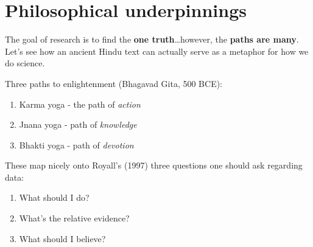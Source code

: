 \documentclass[11pt]{article}
\begin{document}
\section*{Philosophical underpinnings}
\label{sec-3}
The goal of research is to find the \textbf{one truth}\ldots{}however, the \textbf{paths are many}.  Let's see how an ancient Hindu text can actually serve as a metaphor for how we do science.

Three paths to enlightenment (Bhagavad Gita, 500 BCE):
\begin{enumerate}
\item Karma yoga - the path of \emph{action}
\item Jnana yoga - path of \emph{knowledge}
\item Bhakti yoga - path of \emph{devotion}
\end{enumerate}

These map nicely onto Royall's (1997) three questions one should ask regarding data:
\begin{enumerate}
\item What should I do?
\item What's the relative evidence?
\item What should I believe?
\end{enumerate}
\end{document}
